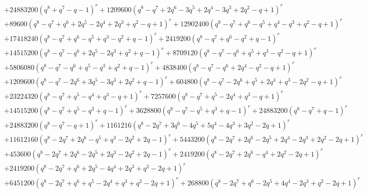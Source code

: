 \documentclass[11pt,english]{amsart}
\numberwithin{equation}{section}
\numberwithin{figure}{section}
\theoremstyle{plain}
\theoremstyle{plain}
\theoremstyle{definition}
\theoremstyle{remark}
\begin{document}
{\begin{align*}
& + 24883200  {\left(q^{8} + q^{7} - q - 1\right)}^{r} + 1209600  {\left(q^{8} - q^{7} + 2  q^{6} - 3  q^{5} + 2  q^{4} - 3  q^{3} + 2  q^{2} - q + 1\right)}^{r} \\
& + 89600  {\left(q^{8} - q^{7} + q^{6} + 2  q^{5} - 2  q^{4} + 2  q^{3} + q^{2} - q + 1\right)}^{r} + 12902400  {\left(q^{8} - q^{7} + q^{6} - q^{5} + q^{4} - q^{3} + q^{2} - q + 1\right)}^{r} \\
& + 17418240  {\left(q^{8} - q^{7} + q^{6} - q^{5} + q^{3} - q^{2} + q - 1\right)}^{r} + 2419200  {\left(q^{8} - q^{7} + q^{6} - q^{2} + q - 1\right)}^{r} \\
& + 14515200  {\left(q^{8} - q^{7} - q^{6} + 2  q^{5} - 2  q^{3} + q^{2} + q - 1\right)}^{r} + 8709120  {\left(q^{8} - q^{7} - q^{6} + q^{5} + q^{3} - q^{2} - q + 1\right)}^{r} \\
& + 5806080  {\left(q^{8} - q^{7} - q^{6} + q^{5} - q^{3} + q^{2} + q - 1\right)}^{r} + 4838400  {\left(q^{8} - q^{7} - q^{6} + 2  q^{4} - q^{2} - q + 1\right)}^{r} \\
& + 1209600  {\left(q^{8} - q^{7} - 2  q^{6} + 3  q^{5} - 3  q^{3} + 2  q^{2} + q - 1\right)}^{r} + 604800  {\left(q^{8} - q^{7} - 2  q^{6} + q^{5} + 2  q^{4} + q^{3} - 2  q^{2} - q + 1\right)}^{r} \\
& + 23224320  {\left(q^{8} - q^{7} + q^{5} - q^{4} + q^{3} - q + 1\right)}^{r} + 7257600  {\left(q^{8} - q^{7} + q^{5} - 2  q^{4} + q^{3} - q + 1\right)}^{r} \\
& + 14515200  {\left(q^{8} - q^{7} + q^{5} - q^{3} + q - 1\right)}^{r} + 3628800  {\left(q^{8} - q^{7} - q^{5} + q^{3} + q - 1\right)}^{r} + 24883200  {\left(q^{8} - q^{7} + q - 1\right)}^{r} \\
& + 24883200  {\left(q^{8} - q^{7} - q + 1\right)}^{r} + 1161216  {\left(q^{8} - 2  q^{7} + 3  q^{6} - 4  q^{5} + 5  q^{4} - 4  q^{3} + 3  q^{2} - 2  q + 1\right)}^{r} \\
& + 11612160  {\left(q^{8} - 2  q^{7} + 2  q^{6} - q^{5} + q^{3} - 2  q^{2} + 2  q - 1\right)}^{r} + 5443200  {\left(q^{8} - 2  q^{7} + 2  q^{6} - 2  q^{5} + 2  q^{4} - 2  q^{3} + 2  q^{2} - 2  q + 1\right)}^{r} \\
& + 453600  {\left(q^{8} - 2  q^{7} + 2  q^{6} - 2  q^{5} + 2  q^{3} - 2  q^{2} + 2  q - 1\right)}^{r} + 2419200  {\left(q^{8} - 2  q^{7} + 2  q^{6} - q^{4} + 2  q^{2} - 2  q + 1\right)}^{r} \\
& + 2419200  {\left(q^{8} - 2  q^{7} + q^{6} + 2  q^{5} - 4  q^{4} + 2  q^{3} + q^{2} - 2  q + 1\right)}^{r} \\
& + 6451200  {\left(q^{8} - 2  q^{7} + q^{6} + q^{5} - 2  q^{4} + q^{3} + q^{2} - 2  q + 1\right)}^{r} + 268800  {\left(q^{8} - 2  q^{7} + q^{6} - 2  q^{5} + 4  q^{4} - 2  q^{3} + q^{2} - 2  q + 1\right)}^{r} \\

\end{align*}}
\end{document}
